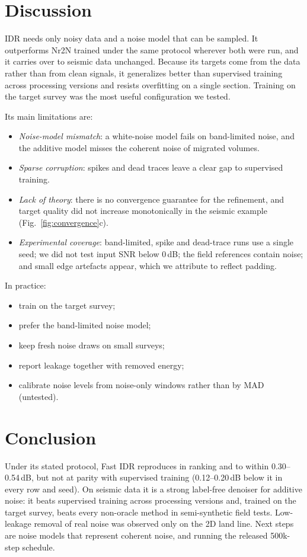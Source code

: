 \documentclass[journal]{IEEEtran}
\begin{document}


\section{Discussion}\label{sec:discussion}
IDR needs only noisy data and a noise model that can be sampled. It outperforms Nr2N trained under the same protocol wherever both were run, and it carries over to seismic data unchanged. Because its targets come from the data rather than from clean signals, it generalizes better than supervised training across processing versions and resists overfitting on a single section. Training on the target survey was the most useful configuration we tested.

Its main limitations are:
\begin{itemize}
\item \emph{Noise-model mismatch}: a white-noise model fails on band-limited noise, and the additive model misses the coherent noise of migrated volumes.
\item \emph{Sparse corruption}: spikes and dead traces leave a clear gap to supervised training.
\item \emph{Lack of theory}: there is no convergence guarantee for the refinement, and target quality did not increase monotonically in the seismic example (Fig.~\ref{fig:convergence}c).
\item \emph{Experimental coverage}: band-limited, spike and dead-trace runs use a single seed; we did not test input SNR below 0\,dB; the field references contain noise; and small edge artefacts appear, which we attribute to reflect padding.
\end{itemize}

In practice:
\begin{itemize}
\item train on the target survey;
\item prefer the band-limited noise model;
\item keep fresh noise draws on small surveys;
\item report leakage together with removed energy;
\item calibrate noise levels from noise-only windows rather than by MAD (untested).
\end{itemize}

\section{Conclusion}\label{sec:conclusion}
Under its stated protocol, Fast IDR reproduces in ranking and to within 0.30--0.54\,dB, but not at parity with supervised training (0.12--0.20\,dB below it in every row and seed). On seismic data it is a strong label-free denoiser for additive noise: it beats supervised training across processing versions and, trained on the target survey, beats every non-oracle method in semi-synthetic field tests. Low-leakage removal of real noise was observed only on the 2D land line. Next steps are noise models that represent coherent noise, and running the released 500k-step schedule.
\end{document}
